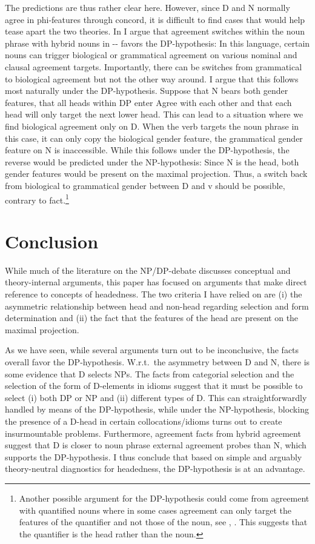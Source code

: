 \documentclass[output=paper,colorlinks,citecolor=black,
]{langscibook}
\begin{document}
The predictions are thus rather clear here. However, since D and N normally agree in phi-features through concord, it is difficult to find cases that would help tease apart the two theories. In \citet{Salzmann:2020:NP-DP} I argue that agreement switches within the noun phrase with hybrid nouns in -- favors the DP-hypothesis: In this language, certain nouns can trigger biological or grammatical agreement on various nominal and clausal agreement targets. Importantly, there can be switches from grammatical to biological agreement but not the other way around. I argue that this follows most naturally under the DP-hypothesis. Suppose that N bears both gender features, that all heads within DP enter Agree with each other and that each head will only target the next lower head. This can lead to a situation where we find biological agreement only on D. When the verb targets the noun phrase in this case, it can only copy the biological gender feature, the grammatical gender feature on N is inaccessible. While this follows under the DP-hypothesis, the reverse would be predicted under the NP-hypothesis: Since N is the head, both gender features would be present on the maximal projection. Thus, a switch back from biological to grammatical gender between D and v should be possible, contrary to fact.\footnote{Another possible argument for the DP-hypothesis could come from agreement with quantified nouns where in some cases agreement can only target the features of the quantifier and not those of the noun, see \citet{Danon:2013:AgreementAlternationQuantifiedNom}, \citet{Driemel-Stojkovic2019:AgreeQP}. This suggests that the quantifier is the head rather than the noun.}

\section{Conclusion}
\label{sec-conclusion}

While much of the literature on the NP/DP-debate discusses conceptual and theory-internal arguments, this paper has focused on arguments that make direct reference to concepts of headedness. The two criteria I have relied on are (i) the asymmetric relationship between head and non-head regarding selection and form determination and (ii) the fact that the features of the head are present on the maximal projection. 

As we have seen, while several arguments turn out to be inconclusive, the facts overall favor the DP-hypothesis. W.r.t.\ the asymmetry between D and N, there is some evidence that D selects NPs. The facts from categorial selection and the selection of the form of D-elements in idioms suggest that it must be possible to select (i) both DP or NP and (ii) different types of D. This can straightforwardly handled by means of the DP-hypothesis, while under the NP-hypothesis, blocking the presence of a D-head in certain collocations/idioms turns out to create insurmountable problems. Furthermore, agreement facts from hybrid agreement suggest that D is closer to noun phrase external agreement probes than N, which supports the DP-hypothesis. I thus conclude that based on simple and arguably theory-neutral diagnostics for headedness, the DP-hypothesis is at an advantage.
\end{document}
